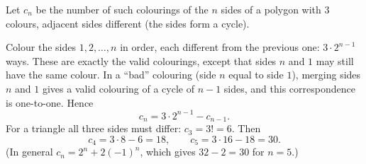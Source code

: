 Let $c_n$ be the number of such colourings of the $n$ sides of a polygon with $3$ colours, adjacent sides different (the sides form a cycle).

Colour the sides $1,2,\dots,n$ in order, each different from the previous one: $3\cdot2^{n-1}$ ways. These are exactly the valid colourings, except that sides $n$ and $1$ may still have the same colour. In a ``bad'' colouring (side $n$ equal to side $1$), merging sides $n$ and $1$ gives a valid colouring of a cycle of $n-1$ sides, and this correspondence is one-to-one. Hence
\[
c_n=3\cdot2^{n-1}-c_{n-1}.
\]
For a triangle all three sides must differ: $c_3=3!=6$. Then
\[
c_4=3\cdot8-6=18,\qquad c_5=3\cdot16-18=\boxed{30}.
\]
(In general $c_n=2^n+2(-1)^n$, which gives $32-2=30$ for $n=5$.)

